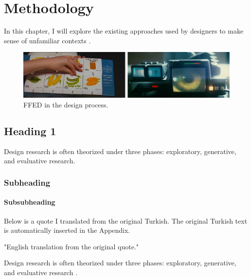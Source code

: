 \chapter{Methodology}
\label{chp:b3}

In this chapter, I will explore the existing approaches used by designers to make sense of unfamiliar contexts \cite{aaltonenHowWeMake2005}.

\begin{figure}[h!]
	\centering
	\includegraphics[width=.99\textwidth]{figures/2001-Bladerunner}
	\caption{FFED in the design process.}
	\label{fig:FFED-2}
\end{figure}

\section{Heading 1}
Design research is often theorized under three phases: exploratory, generative, and evaluative research.

\subsection{Subheading}
\label{subsec:subheading-2}

\subsubsection{Subsubheading}
\label{subsubsec:subsubheading-2}

Below is a quote I translated from the original Turkish. The original Turkish text is automatically inserted in the Appendix.

\begin{displayquote}
	"English translation from the original quote."
\end{displayquote}

Design research is often theorized under three phases: exploratory, generative, and evaluative research \cite{aaltonenHowWeMake2005}. 
